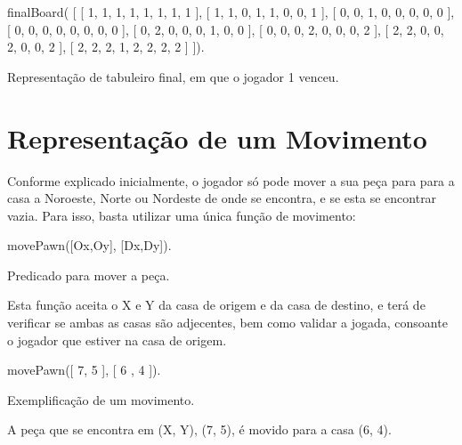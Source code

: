 \documentclass[15pt,a4paper]{article}
\begin{document}
\begin{code}[H]
	\begin{verbatimtab}

finalBoard(
	[
		[ 1, 1, 1, 1, 1, 1, 1, 1 ],
		[ 1, 1, 0, 1, 1, 0, 0, 1 ],
		[ 0, 0, 1, 0, 0, 0, 0, 0 ],
		[ 0, 0, 0, 0, 0, 0, 0, 0 ],
		[ 0, 2, 0, 0, 0, 1, 0, 0 ],
		[ 0, 0, 0, 2, 0, 0, 0, 2 ],
		[ 2, 2, 0, 0, 2, 0, 0, 2 ],
		[ 2, 2, 2, 1, 2, 2, 2, 2 ]
	]).
\end{verbatimtab}
\caption{Representação de tabuleiro final, em que o jogador 1 venceu.}
\end{code}



\section{Representação de um Movimento}


Conforme explicado inicialmente, o jogador só pode mover a sua peça para para a casa a Noroeste, Norte ou Nordeste de onde se encontra, e se esta se encontrar vazia. Para isso, basta utilizar uma única função de movimento:
\begin{code}[H]
	\begin{verbatimtab}

	movePawn([Ox,Oy], [Dx,Dy]).
\end{verbatimtab}
\caption{Predicado para mover a peça.}
\end{code}
Esta função aceita o X e Y da casa de origem e da casa de destino, e terá de verificar se ambas as casas são adjecentes, bem como validar a jogada, consoante o jogador que estiver na casa de origem.

\begin{code}[H]
	\begin{verbatimtab}

	movePawn([ 7, 5 ], [ 6 , 4 ]).
\end{verbatimtab}
\caption{Exemplificação de um movimento.}
\end{code}
A peça que se encontra em (X, Y), (7, 5), é movido para a casa (6, 4).
\end{document}
